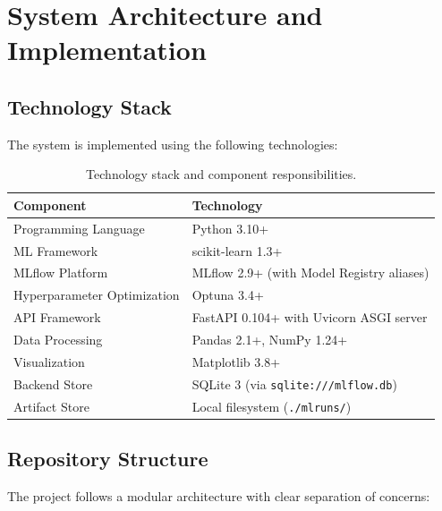 \documentclass[11pt,a4paper]{article}
\begin{document}
\section{System Architecture and Implementation}
\label{sec:architecture}

\subsection{Technology Stack}

The system is implemented using the following technologies:

\begin{table}[H]
\centering
\caption{Technology stack and component responsibilities.}
\label{tab:stack}
\small
\begin{tabularx}{\linewidth}{lX}
\toprule
\textbf{Component} & \textbf{Technology} \\
\midrule
Programming Language & Python 3.10+ \\
ML Framework & scikit-learn 1.3+ \\
MLflow Platform & MLflow 2.9+ (with Model Registry aliases) \\
Hyperparameter Optimization & Optuna 3.4+ \\
API Framework & FastAPI 0.104+ with Uvicorn ASGI server \\
Data Processing & Pandas 2.1+, NumPy 1.24+ \\
Visualization & Matplotlib 3.8+ \\
Backend Store & SQLite 3 (via \texttt{sqlite:///mlflow.db}) \\
Artifact Store & Local filesystem (\texttt{./mlruns/}) \\
\bottomrule
\end{tabularx}
\end{table}

\subsection{Repository Structure}

The project follows a modular architecture with clear separation of concerns:
\end{document}
